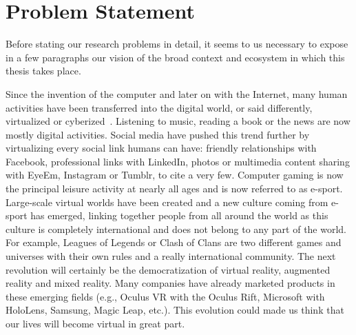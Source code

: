\section{Problem Statement}

Before stating our research problems in detail, it seems to us necessary to expose in a few paragraphs our vision of the broad context and ecosystem in which this thesis takes place.

Since the invention of the computer and later on with the Internet, many human activities have been transferred into the digital world, or said differently, virtualized or cyberized~\cite{ma2015cybermatics}. Listening to music, reading a book or the news are now mostly digital activities. Social media have pushed this trend further by virtualizing every social link humans can have: friendly relationships with Facebook, professional links with LinkedIn, photos or multimedia content sharing with EyeEm, Instagram or Tumblr, to cite a very few. Computer gaming is now the principal leisure activity at nearly all ages and is now referred to as e-sport. Large-scale virtual worlds have been created and a new culture coming from e-sport has emerged, linking together people from all around the world as this culture is completely international and does not belong to any part of the world. For example, Leagues of Legends or Clash of Clans are two different games and universes with their own rules and a really international community. The next revolution will certainly be the democratization of virtual reality, augmented reality and mixed reality. Many companies have already marketed products in these emerging fields (e.g., Oculus VR with the Oculus Rift, Microsoft with HoloLens, Samsung, Magic Leap, etc.). This evolution could made us think that our lives will become virtual in great part.

